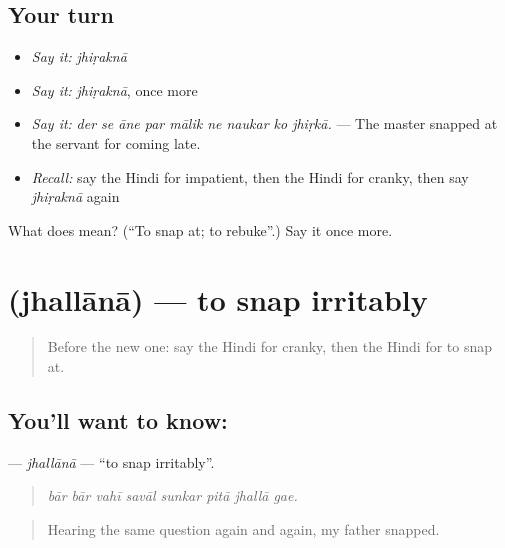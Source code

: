 \subsection*{Your turn}
\begin{itemize}
\raggedright
  \item \emph{Say it:} \emph{jhiṛaknā}
  \item \emph{Say it:} \emph{jhiṛaknā}, once more
  \item \emph{Say it:} \emph{der se āne par mālik ne naukar ko jhiṛkā.} — The master snapped at the servant for coming late.
  \item \emph{Recall:} say the Hindi for impatient, then the Hindi for cranky, then say \emph{jhiṛaknā} again
\end{itemize}

\begin{tcolorbox}[breakable,colback=teal!4,colframe=teal!35!black,title={Before you move on}]
What does  mean? (\textquotedblleft{}To snap at; to rebuke\textquotedblright{}.) Say it once more.
\end{tcolorbox}
\section[\texorpdfstring{\hi{झल्लाना} (jhallānā)}{झल्लाना (jhallānā)}]{ (jhallānā) — to snap irritably}

\label{lesson:HI-C468-jhallana}



\begin{quote}
Before the new one: say the Hindi for cranky, then the Hindi for to snap at.
\end{quote}

\subsection*{You'll want to know: }
\textbf{} — \emph{jhallānā} — \textquotedblleft{}to snap irritably\textquotedblright{}.

\begin{quote}
       
\end{quote}

\begin{quote}
\emph{bār bār vahī savāl sunkar pitā jhallā gae.}
\end{quote}

\begin{quote}
Hearing the same question again and again, my father snapped.
\end{quote}

